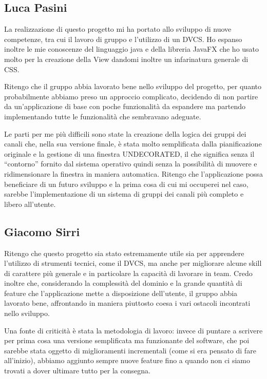 \documentclass[a4paper,12pt]{report}
\begin{document}
\subsection{Luca Pasini}
La realizzazione di questo progetto mi ha portato allo sviluppo di nuove competenze, tra cui il lavoro di gruppo e l’utilizzo di un DVCS.  Ho espanso inoltre le mie conoscenze del linguaggio java e della libreria JavaFX che ho usato molto per la creazione della View dandomi inoltre un infarinatura generale di CSS. 

Ritengo che il gruppo abbia lavorato bene nello sviluppo del progetto, per quanto probabilmente abbiamo preso un approccio complicato, decidendo di non partire da un'applicazione di base con poche funzionalità da espandere ma partendo implementando tutte le funzionalità che sembravano adeguate.

Le parti per me più difficili sono state la creazione della logica dei gruppi dei canali che, nella sua versione finale, è stata molto semplificata dalla pianificazione originale e la gestione di una finestra UNDECORATED, il che significa senza il “contorno” fornito dal sistema operativo quindi senza la possibilità di muovere e ridimensionare la finestra in maniera automatica.
Ritengo che l’applicazione possa beneficiare di un futuro sviluppo e la prima cosa di cui mi occuperei nel caso, sarebbe l’implementazione di un sistema di gruppi dei canali più completo e libero all’utente.

\subsection{Giacomo Sirri}
Ritengo che questo progetto sia stato estremamente utile sia per apprendere l’utilizzo di strumenti tecnici, come il DVCS, ma anche per migliorare alcune skill di carattere più generale e in particolare la capacità di lavorare in team. Credo inoltre che, considerando la complessità del dominio e la grande quantità di feature che l’applicazione mette a disposizione dell’utente, il gruppo abbia lavorato bene, affrontando in maniera piuttosto coesa i vari ostacoli incontrati nello sviluppo. 

Una fonte di criticità è stata la metodologia di lavoro: invece di puntare a scrivere per prima cosa una versione semplificata ma funzionante del software, che poi sarebbe stata oggetto di miglioramenti incrementali (come si era pensato di fare all’inizio), abbiamo aggiunto sempre nuove feature fino a quando non ci siamo trovati a dover ultimare tutto per la consegna.
\end{document}
